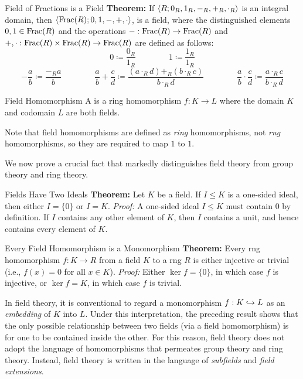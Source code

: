 \begin{thmbox}{Field of Fractions is a Field}
	\textbf{Theorem:} If ${\langle {R; 0_R, 1_R, -_R, +_R, \cdot_R} \rangle}$ is an integral domain, then ${\langle {\operatorname{Frac}(R); 0, 1, -, +, \cdot} \rangle}$, is a field, where the distinguished elements $0, 1 \in \operatorname{Frac}(R)$ and the operations $-: \operatorname{Frac}(R) \to \operatorname{Frac}(R)$ and $+, \cdot: \operatorname{Frac}(R) \times \operatorname{Frac}(R) \to \operatorname{Frac}(R)$ are defined as follows:
	\[ 0 \coloneq \frac{0_R}{1_R}
	\qquad\qquad
	1 \coloneq \frac{1_R}{1_R} \]
	\[ -\frac{a}{b} \coloneq \frac{-_R a}{b}
	\qquad\qquad
	\frac{a}{b} + \frac{c}{d} \coloneq \frac{(a \cdot_R d) +_R (b \cdot_R c)}{b \cdot_R d}
	\qquad\qquad
	\frac{a}{b} \cdot \frac{c}{d} \coloneq \frac{a \cdot_R c}{b \cdot_R d} \]
\end{thmbox}

\begin{dfnbox}{Field Homomorphism}
	A  is a ring homomorphism $f: K \to L$ where the domain $K$ and codomain $L$ are both fields.
\end{dfnbox}

Note that field homomorphisms are defined as \textit{ring} homomorphisms, not \textit{rng} homomorphisms, so they are required to map $1$ to $1$.

We now prove a crucial fact that markedly distinguishes field theory from group theory and ring theory.

\begin{thmbox}{Fields Have Two Ideals}
	\textbf{Theorem:} Let $K$ be a field. If $I \le K$ is a one-sided ideal, then either $I = \{0\}$ or $I = K$.
\tcblower
	\textit{Proof:} A one-sided ideal $I \le K$ must contain $0$ by definition. If $I$ contains any other element of $K$, then $I$ contains a unit, and hence contains every element of $K$.
\end{thmbox}

\begin{thmbox}{Every Field Homomorphism is a Monomorphism}
	\textbf{Theorem:} Every rng homomorphism $f: K \to R$ from a field $K$ to a rng $R$ is either injective or trivial (i.e., $f(x) = 0$ for all $x \in K$).
\tcblower
	\textit{Proof:} Either $\ker f = \{0\}$, in which case $f$ is injective, or $\ker f = K$, in which case $f$ is trivial.
\end{thmbox}

In field theory, it is conventional to regard a monomorphism $f: K \hookrightarrow L$ as an \textit{embedding} of $K$ into $L$. Under this interpretation, the preceding result shows that the only possible relationship between two fields (via a field homomorphism) is for one to be contained inside the other. For this reason, field theory does not adopt the language of homomorphisms that permeates group theory and ring theory. Instead, field theory is written in the language of \textit{subfields} and \textit{field extensions}.

